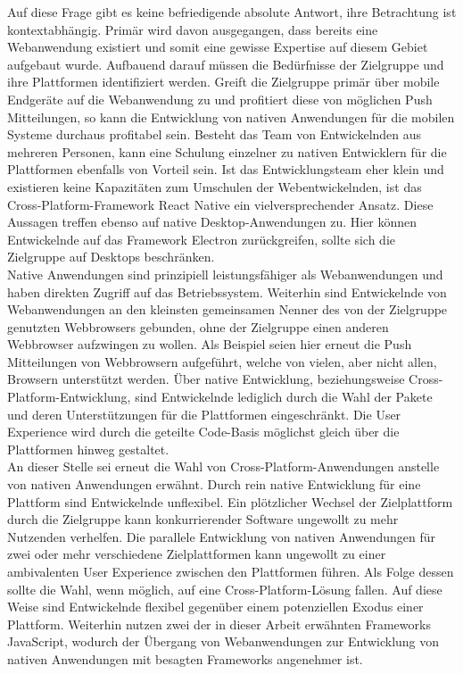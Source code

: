 \documentclass[a4paper]{scrartcl}
\begin{document}
Auf diese Frage gibt es keine befriedigende absolute Antwort, ihre Betrachtung ist kontextabhängig. Primär wird davon ausgegangen, dass bereits eine Webanwendung existiert und somit eine gewisse Expertise auf diesem Gebiet aufgebaut wurde. Aufbauend darauf müssen die Bedürfnisse der Zielgruppe und ihre Plattformen identifiziert werden. Greift die Zielgruppe primär über mobile Endgeräte auf die Webanwendung zu und profitiert diese von möglichen Push Mitteilungen, so kann die Entwicklung von nativen Anwendungen für die mobilen Systeme durchaus profitabel sein. Besteht das Team von Entwickelnden aus mehreren Personen, kann eine Schulung einzelner zu nativen Entwicklern für die Plattformen ebenfalls von Vorteil sein. Ist das Entwicklungsteam eher klein und existieren keine Kapazitäten zum Umschulen der Webentwickelnden, ist das Cross-Platform-Framework React Native ein vielversprechender Ansatz. Diese Aussagen treffen ebenso auf native Desktop-Anwendungen zu. Hier können Entwickelnde auf das Framework Electron zurückgreifen, sollte sich die Zielgruppe auf Desktops beschränken. \\
Native Anwendungen sind prinzipiell leistungsfähiger als Webanwendungen und haben direkten Zugriff auf das Betriebssystem. Weiterhin sind Entwickelnde von Webanwendungen an den kleinsten gemeinsamen Nenner des von der Zielgruppe genutzten Webbrowsers gebunden, ohne der Zielgruppe einen anderen Webbrowser aufzwingen zu wollen. Als Beispiel seien hier erneut die Push Mitteilungen von Webbrowsern aufgeführt, welche von vielen, aber nicht allen, Browsern unterstützt werden. Über native Entwicklung, beziehungsweise Cross-Platform-Entwicklung, sind Entwickelnde lediglich durch die Wahl der Pakete und deren Unterstützungen für die Plattformen eingeschränkt. Die User Experience wird durch die geteilte Code-Basis möglichst gleich über die Plattformen hinweg gestaltet. \\
An dieser Stelle sei erneut die Wahl von Cross-Platform-Anwendungen anstelle von nativen Anwendungen erwähnt. Durch rein native Entwicklung für eine Plattform sind Entwickelnde unflexibel. Ein plötzlicher Wechsel der Zielplattform durch die Zielgruppe kann konkurrierender Software ungewollt zu mehr Nutzenden verhelfen. Die parallele Entwicklung von nativen Anwendungen für zwei oder mehr verschiedene Zielplattformen kann ungewollt zu einer ambivalenten User Experience zwischen den Plattformen führen. Als Folge dessen sollte die Wahl, wenn möglich, auf eine Cross-Platform-Lösung fallen. Auf diese Weise sind Entwickelnde flexibel gegenüber einem potenziellen Exodus einer Plattform. Weiterhin nutzen zwei der in dieser Arbeit erwähnten Frameworks JavaScript, wodurch der Übergang von Webanwendungen zur Entwicklung von nativen Anwendungen mit besagten Frameworks angenehmer ist. \\
\end{document}
